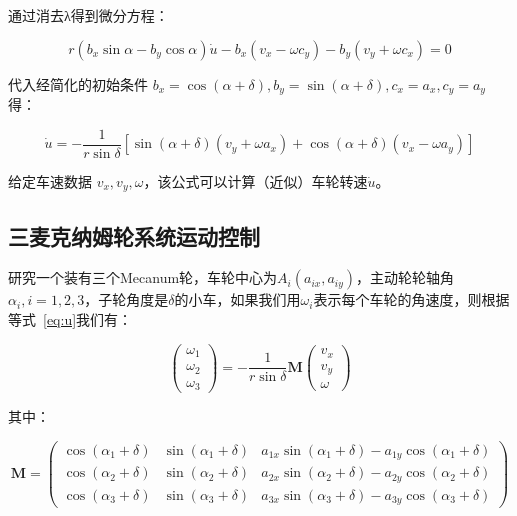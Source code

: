 通过消去λ得到微分方程：

\begin{equation}
    r\left(b_{x} \sin \alpha-b_{y} \cos \alpha\right) \dot{u}-b_{x}\left(v_{x}-\omega c_{y}\right)-b_{y}\left(v_{y}+\omega c_{x}\right)=0
\end{equation}

代入经简化的初始条件 $b_{x}=\cos (\alpha+\delta), b_{y}=\sin (\alpha+\delta), c_{x}=a_{x}, c_{y}=a_{y}$ 得：

\begin{equation}
    \label{eq:u}
    \dot{u}=-\frac{1}{r \sin \delta}\left[\sin (\alpha+\delta)\left(v_{y}+\omega a_{x}\right)+\cos (\alpha+\delta)\left(v_{x}-\omega a_{y}\right)\right]
\end{equation}

给定车速数据 $v_{x}, v_{y}, \omega$，该公式可以计算（近似）车轮转速$\dot{u}$。

\subsection{三麦克纳姆轮系统运动控制}

研究一个装有三个Mecanum轮，车轮中心为$A_{i}\left(a_{i x}, a_{i y}\right)$，主动轮轮轴角$\alpha_{i}, i=1,2,3$，子轮角度是$\delta$的小车，如果我们用$\omega_i$表示每个车轮的角速度，则根据等式~\ref{eq:u}我们有：

\begin{equation}
    \label{eq:inverse}
    \left(\begin{array}{l}
    {\omega_{1}} \\
    {\omega_{2}} \\
    {\omega_{3}}
    \end{array}\right)=-\frac{1}{r \sin \delta} \mathbf{M}\left(\begin{array}{c}
    {v_{x}} \\
    {v_{y}} \\
    {\omega}
    \end{array}\right)
\end{equation}

其中：

\begin{equation}
    \mathbf{M}=\left(\begin{array}{ccc}
    {\cos \left(\alpha_{1}+\delta\right)} & {\sin \left(\alpha_{1}+\delta\right)} & {a_{1 x} \sin \left(\alpha_{1}+\delta\right)-a_{1 y} \cos \left(\alpha_{1}+\delta\right)} \\
    {\cos \left(\alpha_{2}+\delta\right)} & {\sin \left(\alpha_{2}+\delta\right)} & {a_{2 x} \sin \left(\alpha_{2}+\delta\right)-a_{2 y} \cos \left(\alpha_{2}+\delta\right)} \\
    {\cos \left(\alpha_{3}+\delta\right)} & {\sin \left(\alpha_{3}+\delta\right)} & {a_{3 x} \sin \left(\alpha_{3}+\delta\right)-a_{3 y} \cos \left(\alpha_{3}+\delta\right)}
    \end{array}\right)
\end{equation}


